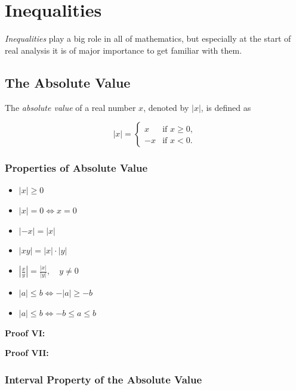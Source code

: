 \chapter{Inequalities}

\emph{Inequalities} play a big role in all of mathematics, but especially at the start of real analysis it is
of major importance to get familiar with them.

\section{The Absolute Value}

The \emph{absolute value} of a real number \(x\), denoted by \(|x|\), is defined as

\[
	|x| =
	\begin{cases}
		x  & \text{if } x \ge 0, \\
		-x & \text{if } x < 0.
	\end{cases}
\]

\subsection{Properties of Absolute Value}

\begin{itemize}

	\item \(|x| \ge 0\)

	\item \(|x| = 0 \iff x = 0\)

	\item \(|-x| = |x|\)

	\item \(|xy| = |x| \cdot |y|\)

	\item \(\left|\frac{x}{y}\right| = \frac{|x|}{|y|}, \quad y \ne 0\)

	\item \(|a| \le b \iff -|a| \ge -b\)

	\item \(|a| \le b \iff -b \le a \le b\)

\end{itemize}

\textbf{Proof VI: }

\textbf{Proof VII: }

\subsection{Interval Property of the Absolute Value}

